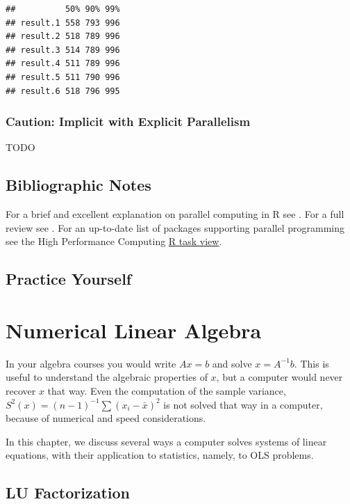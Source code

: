\documentclass[]{book}
\theoremstyle{definition}
\theoremstyle{definition}
\theoremstyle{definition}
\theoremstyle{remark}
\begin{document}
\begin{verbatim}
##          50% 90% 99%
## result.1 558 793 996
## result.2 518 789 996
## result.3 514 789 996
## result.4 511 789 996
## result.5 511 790 996
## result.6 518 796 995
\end{verbatim}

\subsection{Caution: Implicit with Explicit
Parallelism}\label{caution-implicit-with-explicit-parallelism}

TODO

\section{Bibliographic Notes}\label{bibliographic-notes-12}

For a brief and excellent explanation on parallel computing in R see
\citet{schmidberger2009state}. For a full review see
\citet{chapple2016mastering}. For an up-to-date list of packages
supporting parallel programming see the High Performance Computing
\href{https://cran.r-project.org/web/views/HighPerformanceComputing.html}{R
task view}.

\section{Practice Yourself}\label{practice-yourself-13}

\chapter{Numerical Linear Algebra}\label{algebra}

In your algebra courses you would write \(Ax=b\) and solve
\(x=A^{-1}b\). This is useful to understand the algebraic properties of
\(x\), but a computer would never recover \(x\) that way. Even the
computation of the sample variance,
\(S^2(x)=(n-1)^{-1}\sum (x_i-\bar x )^2\) is not solved that way in a
computer, because of numerical and speed considerations.

In this chapter, we discuss several ways a computer solves systems of
linear equations, with their application to statistics, namely, to OLS
problems.

\section{LU Factorization}\label{lu-factorization}
\end{document}
